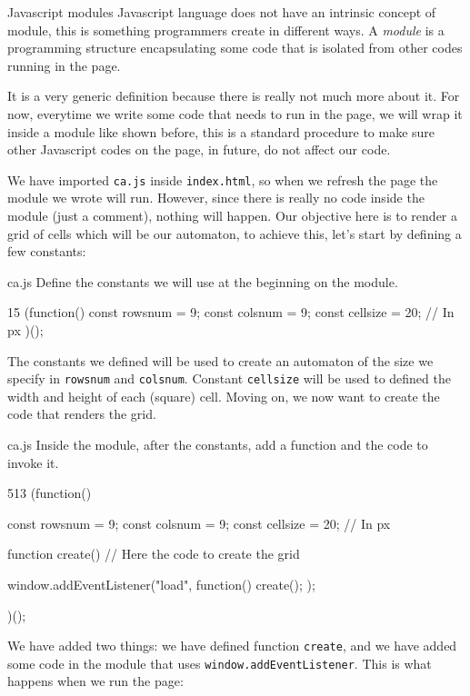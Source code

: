 \begin{tips}{Javascript modules}
Javascript language does not have an intrinsic concept of module, this is something programmers create in
different ways. A \textit{module} is a programming structure encapsulating some code that is isolated
from other codes running in the page.

It is a very generic definition because there is really not much more about it. For now, everytime
we write some code that needs to run in the page, we will wrap it inside a module like shown before,
this is a standard procedure to make sure other Javascript codes on the page, in future, do not
affect our code.
\end{tips}

We have imported \texttt{ca.js} inside \texttt{index.html}, so when we refresh the page the module
we wrote will run. However, since there is really no code inside the module (just a comment),
nothing will happen. Our objective here is to render a grid of cells which will be our automaton,
to achieve this, let's start by defining a few constants:

\begin{programcode}{ca.js}
Define the constants we will use at the beginning on the module.
\begin{codeh1}{1}{5}
(function(){
  const rowsnum = 9;
  const colsnum = 9;
  const cellsize = 20; // In px
})();
\end{codeh1}
\end{programcode}

The constants we defined will be used to create an automaton of the size we specify in 
\texttt{rowsnum} and \texttt{colsnum}. Constant \texttt{cellsize} will be used to defined the
width and height of each (square) cell. Moving on, we now want to create the code that renders the grid.

\begin{programcode}{ca.js}
Inside the module, after the constants, add a function and the code to invoke it.
\begin{codeh1}{5}{13}
(function(){
  const rowsnum = 9;
  const colsnum = 9;
  const cellsize = 20; // In px

  function create() {
    // Here the code to create the grid
  }

  window.addEventListener("load", function() {
    create();
  });
})();
\end{codeh1}
\end{programcode}

We have added two things: we have defined function \texttt{create}, and we have added some code in
the module that uses \texttt{window.addEventListener}. This is what happens when we run the page:

